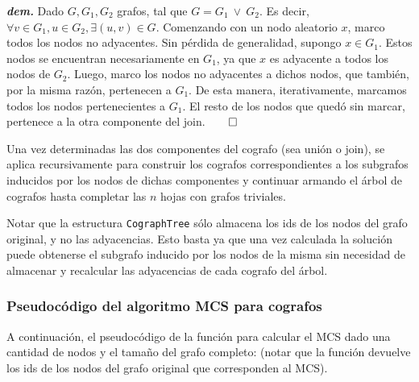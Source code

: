 \emph{\textbf{dem.}} Dado $G, G_1, G_2$ grafos, tal que $G = G_1\ \lor\ G_2$.
Es decir, $\forall v \in G_1, u \in G_2, \exists (u, v) \in G$.
Comenzando con un nodo aleatorio $x$, marco todos los nodos no adyacentes.
Sin p\'erdida de generalidad, supongo $x \in G_1$.
Estos nodos se encuentran necesariamente en $G_1$, ya que $x$ es adyacente a todos los nodos de $G_2$.
Luego, marco los nodos no adyacentes a dichos nodos, que también, por la misma razón, pertenecen a $G_1$.
De esta manera, iterativamente, marcamos todos los nodos pertenecientes a $G_1$.
El resto de los nodos que quedó sin marcar, pertenece a la otra componente del join.$\qed$

Una vez determinadas las dos componentes del cografo (sea unión o join), se aplica recursivamente para construir los cografos correspondientes a los subgrafos inducidos por los nodos de dichas componentes y continuar armando el árbol de cografos hasta completar las $n$ hojas con grafos triviales.

Notar que la estructura \texttt{CographTree} sólo almacena los ids de los nodos del grafo original, y no las adyacencias. Esto basta ya que una vez calculada la solución puede obtenerse el subgrafo inducido por los nodos de la misma sin necesidad de almacenar y recalcular las adyacencias de cada cografo del árbol.

\subsubsection{Pseudocódigo del algoritmo MCS para cografos}

A continuación, el pseudocódigo de la función para calcular el MCS dado una cantidad de nodos y el tamaño del grafo completo: (notar que la función devuelve los ids de los nodos del grafo original que corresponden al MCS).

